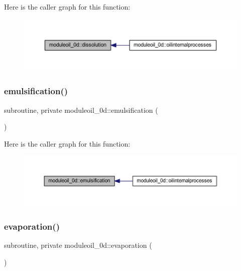 Here is the caller graph for this function\+:\nopagebreak
\begin{figure}[H]
\begin{center}
\leavevmode
\includegraphics[width=350pt]{namespacemoduleoil__0d_a5b8886545b16a4515a2adcc5ae3f6573_icgraph}
\end{center}
\end{figure}
\mbox{\label{namespacemoduleoil__0d_acae01578d384bd637cbfb5b788022edc}} 
\subsubsection{\texorpdfstring{emulsification()}{emulsification()}}
{\footnotesize\ttfamily subroutine, private moduleoil\+\_\+0d\+::emulsification (\begin{DoxyParamCaption}{ }\end{DoxyParamCaption})\hspace{0.3cm}{\ttfamily [private]}}

Here is the caller graph for this function\+:\nopagebreak
\begin{figure}[H]
\begin{center}
\leavevmode
\includegraphics[width=350pt]{namespacemoduleoil__0d_acae01578d384bd637cbfb5b788022edc_icgraph}
\end{center}
\end{figure}
\mbox{\label{namespacemoduleoil__0d_ae6b04a828d4410d4e96bd3d91b7287a1}} 
\subsubsection{\texorpdfstring{evaporation()}{evaporation()}}
{\footnotesize\ttfamily subroutine, private moduleoil\+\_\+0d\+::evaporation (\begin{DoxyParamCaption}{ }\end{DoxyParamCaption})\hspace{0.3cm}{\ttfamily [private]}}

